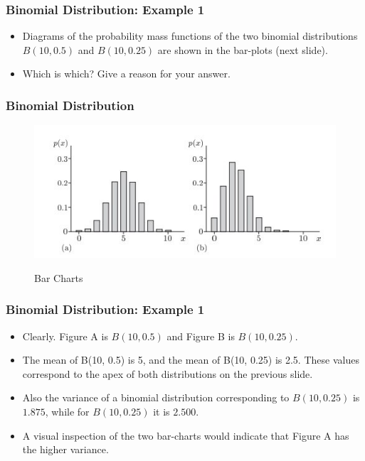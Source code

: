 \documentclass[IntroMain.tex]{subfiles}
\begin{document}
\begin{frame}
	\frametitle{Binomial Distribution: Example 1}
	\begin{itemize} \item Diagrams of the probability mass functions of the two binomial
		distributions $B(10, 0.5)$ and $B(10, 0.25)$ are shown in the bar-plots (next slide). \item Which
		is which? Give a reason for your answer.
	\end{itemize}
\end{frame}
\begin{frame}
	\frametitle{Binomial Distribution}
	\begin{figure}
		\includegraphics[scale=0.60]{images/4ABarCharts.jpg}\\
		\caption{Bar Charts}
	\end{figure}
\end{frame}
\begin{frame}
	\frametitle{Binomial Distribution: Example 1}
	\begin{itemize}
		\item Clearly. Figure A is $B(10, 0.5)$ and Figure B is $B(10, 0.25)$.
		\item The mean of B(10, 0.5) is 5, and the mean of B(10, 0.25) is 2.5. These values correspond to the apex of both distributions on the previous slide.
		\item Also the variance of a binomial distribution corresponding to $B(10, 0.25)$ is $1.875$, while for $B(10, 0.25)$ it is $2.500$.
		\item A visual inspection of the two bar-charts would indicate that Figure A has the higher variance.
	\end{itemize}
\end{frame}
\end{document}

